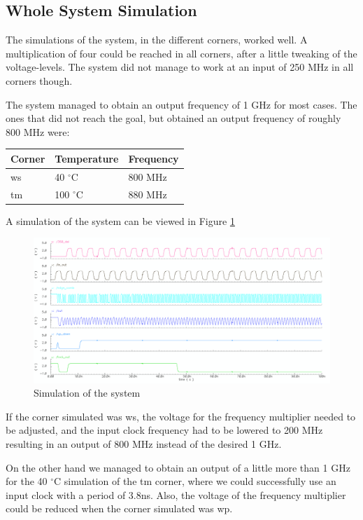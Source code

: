 \documentclass[a4paper,12pt]{article} \usepackage{graphicx}
\newcommand{\degree}{\ensuremath{^\circ}}
\begin{document}
\subsection{Whole System Simulation}
The simulations of the system, in the different corners, worked well. A multiplication
of four could be reached in all corners, after a little tweaking of the voltage-levels.
The system did not manage to work at an input of 250 MHz in all corners though.

The system managed to obtain an output frequency of 1 GHz for most cases. The ones that
did not reach the goal, but obtained an output frequency of roughly 800 MHz were:

\begin{tabular}{l l l}
Corner & Temperature & Frequency\\ \hline
ws & 40 \degree C & 800 MHz\\
tm & 100 \degree C & 880 MHz
\end{tabular}

A simulation of the system can be viewed in Figure \ref{fig:sim_system}
\begin{figure}[h]
\centering
\includegraphics[width=\textwidth]{../Bilder/Layout/simulation_system.png}
\caption{Simulation of the system}
\label{fig:sim_system}
\end{figure}

If the corner simulated was ws, the voltage for the frequency multiplier
needed to be adjusted, and the input clock frequency had to be lowered 
to 200 MHz resulting in an output of 800 MHz instead of the desired 1 GHz.

On the other hand we managed to obtain an output of a little more than 1 GHz for
the 40 \degree C simulation of the tm corner, where we could successfully use an 
input clock with a period of 3.8ns.
Also, the voltage of the frequency multiplier could be reduced when the corner simulated was wp.
\end{document}
